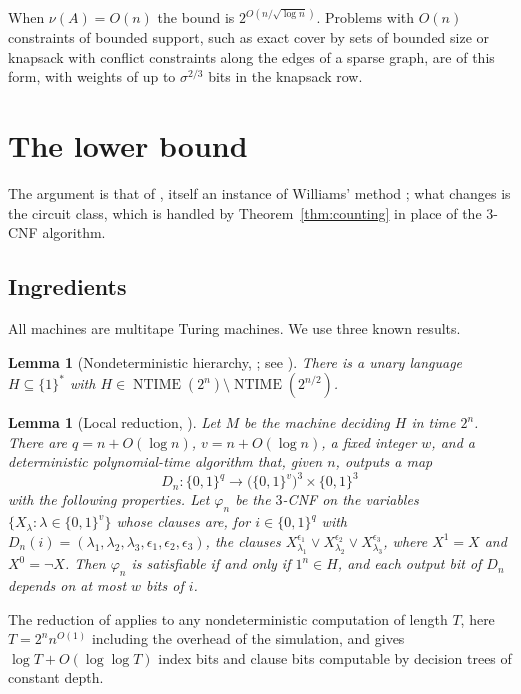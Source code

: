 \documentclass[11pt,reqno]{amsart}
\numberwithin{equation}{section}
\theoremstyle{plain}
\newtheorem{lemma}[theorem]{Lemma}
\theoremstyle{definition}
\theoremstyle{remark}
\DeclareMathOperator{\NTIME}{NTIME}
\begin{document}
When $\nu(A)=O(n)$ the bound is $2^{O(n/\sqrt{\log n})}$. Problems with $O(n)$
constraints of bounded support, such as exact cover by sets of bounded size or
knapsack with conflict constraints along the edges of a sparse graph, are of
this form, with weights of up to $\sigma^{2/3}$ bits in the knapsack row.

\section{The lower bound}\label{sec:lower}

The argument is that of \cite[Appendix C.1]{OAI26}, itself an instance of
Williams' method \cite{Wil13}; what changes is the circuit class, which is
handled by Theorem~\ref{thm:counting} in place of the $3$-CNF algorithm.

\subsection{Ingredients}
All machines are multitape Turing machines. We use three known results.

\begin{lemma}[Nondeterministic hierarchy, {\cite{Zak83}}; see {\cite[Theorem 2.1]{Wil13}}]\label{lem:zak}
There is a unary language $H\subseteq\{1\}^*$ with
$H\in\NTIME(2^n)\setminus\NTIME(2^{n/2})$.
\end{lemma}

\begin{lemma}[Local reduction, {\cite[Theorem 1 and Section 6]{JMV15}}]\label{lem:jmv}
Let $M$ be the machine deciding $H$ in time $2^n$. There are $q=n+O(\log n)$,
$v=n+O(\log n)$, a fixed integer $w$, and a deterministic polynomial-time
algorithm that, given $n$, outputs a map
\[
D_n:\{0,1\}^q\to\bigl(\{0,1\}^v\bigr)^3\times\{0,1\}^3
\]
with the following properties. Let $\varphi_n$ be the $3$-CNF on the variables
$\{X_\lambda:\lambda\in\{0,1\}^v\}$ whose clauses are, for $i\in\{0,1\}^q$ with
$D_n(i)=(\lambda_1,\lambda_2,\lambda_3,\epsilon_1,\epsilon_2,\epsilon_3)$, the
clauses $X_{\lambda_1}^{\epsilon_1}\vee X_{\lambda_2}^{\epsilon_2}\vee
X_{\lambda_3}^{\epsilon_3}$, where $X^1=X$ and $X^0=\neg X$. Then $\varphi_n$ is
satisfiable if and only if $1^n\in H$, and each output bit of $D_n$ depends on at
most $w$ bits of $i$.
\end{lemma}

The reduction of \cite{JMV15} applies to any nondeterministic computation of
length $T$, here $T=2^nn^{O(1)}$ including the overhead of the simulation, and
gives $\log T+O(\log\log T)$ index bits and clause bits computable by decision
trees of constant depth.
\end{document}
